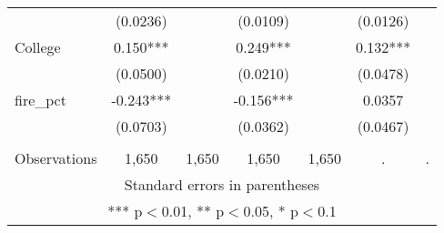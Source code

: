 \begin{tabular}{lcccccc}
 & (0.0236) &  & (0.0109) &  & (0.0126) &  \\
College & 0.150*** &  & 0.249*** &  & 0.132*** &  \\
 & (0.0500) &  & (0.0210) &  & (0.0478) &  \\
fire\_pct & -0.243*** &  & -0.156*** &  & 0.0357 &  \\
 & (0.0703) &  & (0.0362) &  & (0.0467) &  \\
 &  &  &  &  &  &  \\
 Observations & 1,650 & 1,650 & 1,650 & 1,650 & . & . \\ \hline
\multicolumn{7}{c}{ Standard errors in parentheses} \\
\multicolumn{7}{c}{ *** p$<$0.01, ** p$<$0.05, * p$<$0.1} \\
\end{tabular}
